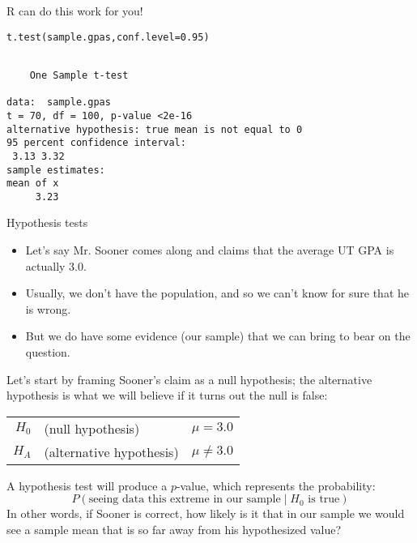 \documentclass{beamer}\usepackage[]{graphicx}\usepackage[]{color}
\makeatletter
\newcommand{\hlnum}[1]{\textcolor[rgb]{0.824,0.412,0.118}{#1}}%
\newcommand{\hlstd}[1]{\textcolor[rgb]{1,0.894,0.769}{#1}}%
\newcommand{\hlkwc}[1]{\textcolor[rgb]{0.78,0.941,0.545}{#1}}%
\newcommand{\hlkwd}[1]{\textcolor[rgb]{1,0.78,0.769}{#1}}%
\newenvironment{kframe}{%
 \def\at@end@of@kframe{}%
 \ifinner\ifhmode%
  \def\at@end@of@kframe{\end{minipage}}%
  \begin{minipage}{\columnwidth}%
 \fi\fi%
 \def\FrameCommand##1{\hskip\@totalleftmargin \hskip-\fboxsep
 \colorbox{shadecolor}{##1}\hskip-\fboxsep
     \hskip-\linewidth \hskip-\@totalleftmargin \hskip\columnwidth}%
 \MakeFramed {\advance\hsize-\width
   \@totalleftmargin\z@ \linewidth\hsize
   \@setminipage}}%
 {\par\unskip\endMakeFramed%
 \at@end@of@kframe}
\newenvironment{knitrout}{}{} %
\makeatother
\begin{document}
\begin{darkframes}
\begin{frame}[fragile]
R can do this work for you!
\begin{knitrout}
\begin{kframe}
\begin{alltt}
\hlkwd{t.test}\hlstd{(sample.gpas,} \hlkwc{conf.level}\hlstd{=}\hlnum{0.95}\hlstd{)}
\end{alltt}
\begin{verbatim}

	One Sample t-test

data:  sample.gpas
t = 70, df = 100, p-value <2e-16
alternative hypothesis: true mean is not equal to 0
95 percent confidence interval:
 3.13 3.32
sample estimates:
mean of x 
     3.23 
\end{verbatim}
\end{kframe}
\end{knitrout}
\end{frame}


\begin{frame}{Hypothesis tests}
\begin{itemize}[<+->]
  \item Let's say Mr. Sooner comes along and claims that the average UT GPA is actually 3.0.
  \item Usually, we don't have the population, and so we can't know for sure that he is wrong.
  \item But we do have some evidence (our sample) that we can bring to bear on the question.
\end{itemize}
\end{frame}

\begin{frame}
Let's start by framing Sooner's claim as a null hypothesis; the alternative hypothesis is what we will believe if it turns out the null is false:

\begin{center}
  \begin{tabular}{rl|l}
    $H_0$ & (null hypothesis) & $\mu=3.0$ \\
    $H_A$ & (alternative hypothesis) & $\mu\neq 3.0$
  \end{tabular}
\end{center}
\pause

A hypothesis test will produce a $p$-value, which represents the probability:
\[
  P(\text{seeing data this extreme in our sample} \mid \text{$H_0$ is true})
\]
\pause
In other words, if Sooner is correct, how likely is it that in our sample we would see a sample mean that is so far away from his hypothesized value?
\end{frame}



\end{darkframes}
\end{document}
